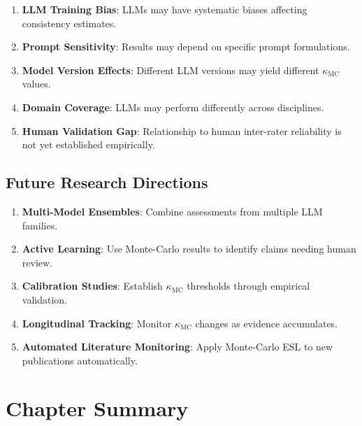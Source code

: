 \documentclass[11pt,a4paper]{article}
\theoremstyle{remark}
\begin{document}
\begin{enumerate}
    \item \textbf{LLM Training Bias}: LLMs may have systematic biases affecting consistency estimates.

    \item \textbf{Prompt Sensitivity}: Results may depend on specific prompt formulations.

    \item \textbf{Model Version Effects}: Different LLM versions may yield different $\kappa_{\text{MC}}$ values.

    \item \textbf{Domain Coverage}: LLMs may perform differently across disciplines.

    \item \textbf{Human Validation Gap}: Relationship to human inter-rater reliability is not yet established empirically.
\end{enumerate}

\subsection{Future Research Directions}

\begin{enumerate}
    \item \textbf{Multi-Model Ensembles}: Combine assessments from multiple LLM families.

    \item \textbf{Active Learning}: Use Monte-Carlo results to identify claims needing human review.

    \item \textbf{Calibration Studies}: Establish $\kappa_{\text{MC}}$ thresholds through empirical validation.

    \item \textbf{Longitudinal Tracking}: Monitor $\kappa_{\text{MC}}$ changes as evidence accumulates.

    \item \textbf{Automated Literature Monitoring}: Apply Monte-Carlo ESL to new publications automatically.
\end{enumerate}


\section{Chapter Summary}
\label{sec:summary}
\end{document}
